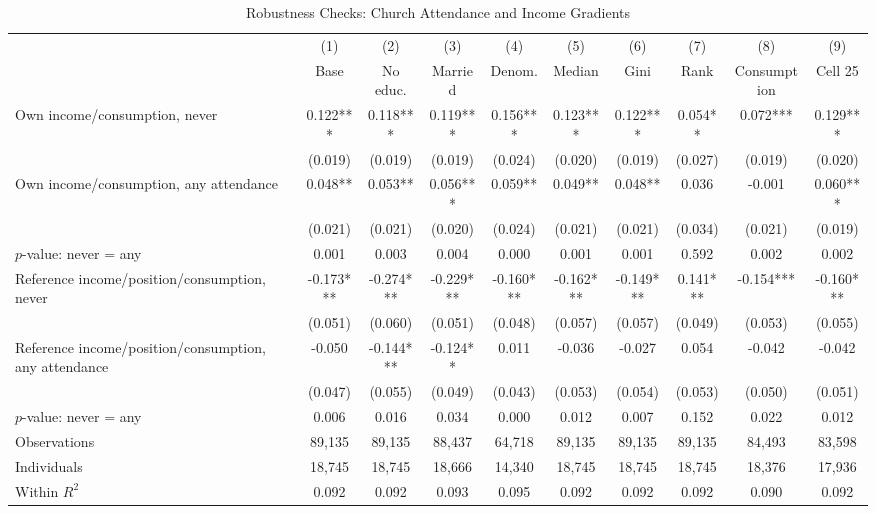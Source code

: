 \begin{table}[!t]
\centering
\caption{Robustness Checks: Church Attendance and Income Gradients}
\label{tab:robustness_attendance_income_gradients}
\begingroup
\scriptsize
\setlength{\tabcolsep}{3.5pt}
\renewcommand{\arraystretch}{1.12}
\begin{adjustbox}{max width=1.00\textwidth,center}
\begin{tabular}{lccccccccc}
\toprule
 & (1) & (2) & (3) & (4) & (5) & (6) & (7) & (8) & (9) \\
\cmidrule(lr){2-10}
 & Base & No educ. & Married & Denom. & Median & Gini & Rank & Consumption & Cell 25 \\
\midrule
Own income/consumption, never & 0.122*** & 0.118*** & 0.119*** & 0.156*** & 0.123*** & 0.122*** & 0.054** & 0.072*** & 0.129*** \\
 & (0.019) & (0.019) & (0.019) & (0.024) & (0.020) & (0.019) & (0.027) & (0.019) & (0.020) \\
Own income/consumption, any attendance & 0.048** & 0.053** & 0.056*** & 0.059** & 0.049** & 0.048** & 0.036 & -0.001 & 0.060*** \\
 & (0.021) & (0.021) & (0.020) & (0.024) & (0.021) & (0.021) & (0.034) & (0.021) & (0.019) \\
\(p\)-value: never = any & 0.001 & 0.003 & 0.004 & 0.000 & 0.001 & 0.001 & 0.592 & 0.002 & 0.002 \\
\addlinespace[0.25em]
Reference income/position/consumption, never & -0.173*** & -0.274*** & -0.229*** & -0.160*** & -0.162*** & -0.149*** & 0.141*** & -0.154*** & -0.160*** \\
 & (0.051) & (0.060) & (0.051) & (0.048) & (0.057) & (0.057) & (0.049) & (0.053) & (0.055) \\
Reference income/position/consumption, any attendance & -0.050 & -0.144*** & -0.124** & 0.011 & -0.036 & -0.027 & 0.054 & -0.042 & -0.042 \\
 & (0.047) & (0.055) & (0.049) & (0.043) & (0.053) & (0.054) & (0.053) & (0.050) & (0.051) \\
\(p\)-value: never = any & 0.006 & 0.016 & 0.034 & 0.000 & 0.012 & 0.007 & 0.152 & 0.022 & 0.012 \\
\midrule
Observations & 89,135 & 89,135 & 88,437 & 64,718 & 89,135 & 89,135 & 89,135 & 84,493 & 83,598 \\
Individuals & 18,745 & 18,745 & 18,666 & 14,340 & 18,745 & 18,745 & 18,745 & 18,376 & 17,936 \\
Within \(R^2\) & 0.092 & 0.092 & 0.093 & 0.095 & 0.092 & 0.092 & 0.092 & 0.090 & 0.092 \\

\end{tabular}
\end{adjustbox}
\end{table}
